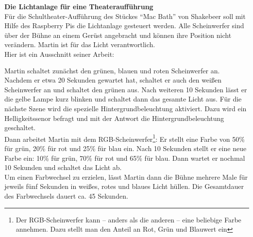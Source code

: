 \documentclass[11pt, a4paper]{article}
\begin{document}
\pagestyle{empty}
\textbf{{\Large Die Lichtanlage für eine Theateraufführung}}\\

Für die Schultheater-Aufführung des Stückes \enquote{Mac Bath} von Shakebeer soll mit Hilfe des Raspberry Pis die Lichtanlage gesteuert werden. Alle Scheinwerfer sind über der Bühne an einem Gerüst angebracht und können ihre Position nicht verändern. Martin ist für das Licht verantwortlich. \\

Hier ist ein Ausschnitt seiner Arbeit:
\begin{mdframed}
Martin schaltet zunächst den grünen, blauen und roten Scheinwerfer an. Nachdem er etwa 20 Sekunden gewartet hat, schaltet er auch den weißen Scheinwerfer an und schaltet den grünen aus. Nach weiteren  10 Sekunden lässt er die gelbe Lampe kurz blinken und schaltet dann das gesamte Licht aus. Für die nächste Szene wird die spezielle Hintergrundbeleuchtung aktiviert. Dazu wird ein Helligkeitssenor befragt und mit der Antwort die Hintergrundbeleuchtung geschaltet.\\

Dann arbeitet Martin mit dem RGB-Scheinwerfer\footnote{Der RGB-Scheinwerfer kann -- anders als die anderen -- eine beliebige Farbe annehmen. Dazu stellt man den Anteil an Rot, Grün und Blauwert ein}: Er stellt eine Farbe von 50\% für grün, 20\% für rot und 25\% für blau ein. Nach 10 Sekunden stellt er eine neue Farbe ein: 10\% für grün, 70\% für rot und 65\% für blau. Dann wartet er nochmal 10 Sekunden und schaltet das Licht ab.\\

Um einen Farbwechsel zu erzielen, lässt Martin dann die Bühne mehrere Male für jeweils fünf Sekunden in weißes, rotes und blaues Licht hüllen. Die Gesamtdauer des Farbwechsels dauert ca. 45 Sekunden.\\
\end{mdframed}
\end{document}
